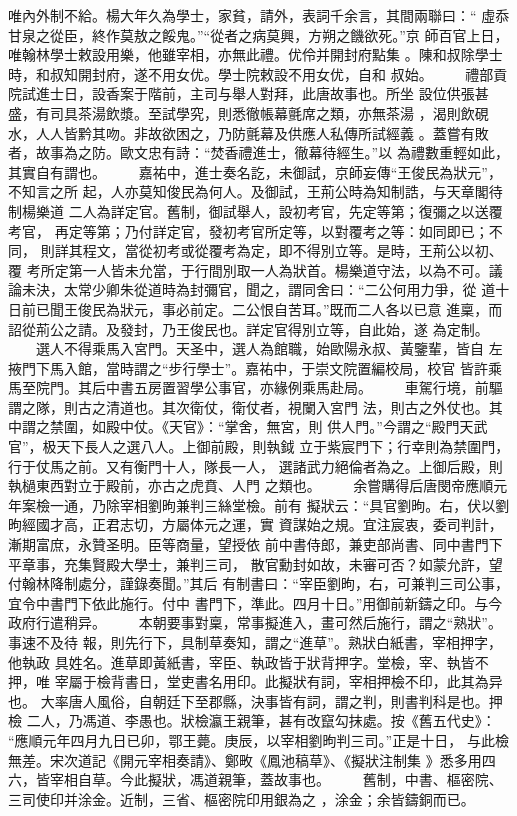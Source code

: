 \documentclass{ctexart}
\begin{document}
唯內外制不給。楊大年久為學士，家貧，請外，表詞千余言，其間兩聯曰：`` 虛忝甘泉之從臣，終作莫敖之餒鬼。''``從者之病莫興，方朔之饑欲死。''京 師百官上日，唯翰林學士敕設用樂，他雖宰相，亦無此禮。优伶并開封府點集 。陳和叔除學士時，和叔知開封府，遂不用女优。學士院敕設不用女优，自和 叔始。 　　禮部貢院試進士日，設香案于階前，主司与舉人對拜，此唐故事也。所坐 設位供張甚盛，有司具茶湯飲漿。至試學究，則悉徹帳幕氈席之類，亦無茶湯 ，渴則飲硯水，人人皆黔其吻。非故欲困之，乃防氈幕及供應人私傳所試經義 。蓋嘗有敗者，故事為之防。歐文忠有詩：``焚香禮進士，徹幕待經生。''以 為禮數重輕如此，其實自有謂也。 　　嘉祐中，進士奏名訖，未御試，京師妄傳``王俊民為狀元''，不知言之所 起，人亦莫知俊民為何人。及御試，王荊公時為知制誥，与天章閣待制楊樂道 二人為詳定官。舊制，御試舉人，設初考官，先定等第；復彌之以送覆考官， 再定等第；乃付詳定官，發初考官所定等，以對覆考之等：如同即已；不同， 則詳其程文，當從初考或從覆考為定，即不得別立等。是時，王荊公以初、覆 考所定第一人皆未允當，于行間別取一人為狀首。楊樂道守法，以為不可。議 論未決，太常少卿朱從道時為封彌官，聞之，謂同舍曰：``二公何用力爭，從 道十日前已聞王俊民為狀元，事必前定。二公恨自苦耳。''既而二人各以已意 進稟，而詔從荊公之請。及發封，乃王俊民也。詳定官得別立等，自此始，遂 為定制。 　　選人不得乘馬入宮門。天圣中，選人為館職，始歐陽永叔、黃鑒輩，皆自 左掖門下馬入館，當時謂之``步行學士''。嘉祐中，于崇文院置編校局，校官 皆許乘馬至院門。其后中書五房置習學公事官，亦緣例乘馬赴局。 　　車駕行境，前驅謂之隊，則古之清道也。其次衛仗，衛仗者，視闌入宮門 法，則古之外仗也。其中謂之禁圍，如殿中仗。《天官》：``掌舍，無宮，則 供人門。''今謂之``殿門天武官''，极天下長人之選八人。上御前殿，則執鉞 立于紫宸門下；行幸則為禁圍門，行于仗馬之前。又有衡門十人，隊長一人， 選諸武力絕倫者為之。上御后殿，則執檛東西對立于殿前，亦古之虎賁、人門 之類也。 　　余嘗購得后唐閔帝應順元年案檢一通，乃除宰相劉昫兼判三絲堂檢。前有 擬狀云：``具官劉昫。右，伏以劉昫經國才高，正君志切，方屬体元之運，實 資謀始之規。宜注宸衷，委司判計，漸期富庶，永贊圣明。臣等商量，望授依 前中書侍郎，兼吏部尚書、同中書門下平章事，充集賢殿大學士，兼判三司， 散官勳封如故，未審可否？如蒙允許，望付翰林降制處分，謹錄奏聞。''其后 有制書曰：``宰臣劉昫，右，可兼判三司公事，宜令中書門下依此施行。付中 書門下，準此。四月十日。''用御前新鑄之印。与今政府行遣稍异。 　　本朝要事對稟，常事擬進入，畫可然后施行，謂之``熟狀''。事速不及待 報，則先行下，具制草奏知，謂之``進草''。熟狀白紙書，宰相押字，他執政 具姓名。進草即黃紙書，宰臣、執政皆于狀背押字。堂檢，宰、執皆不押，唯 宰屬于檢背書日，堂吏書名用印。此擬狀有詞，宰相押檢不印，此其為异也。 大率唐人風俗，自朝廷下至郡縣，決事皆有詞，謂之判，則書判科是也。押檢 二人，乃馮道、李愚也。狀檢瀛王親筆，甚有改竄勾抹處。按《舊五代史》： ``應順元年四月九日已卯，鄂王薨。庚辰，以宰相劉昫判三司。''正是十日， 与此檢無差。宋次道記《開元宰相奏請》、鄭畋《鳳池稿草》、《擬狀注制集 》悉多用四六，皆宰相自草。今此擬狀，馮道親筆，蓋故事也。 　　舊制，中書、樞密院、三司使印并涂金。近制，三省、樞密院印用銀為之 ，涂金；余皆鑄銅而已。
\clearpage
\end{document}
